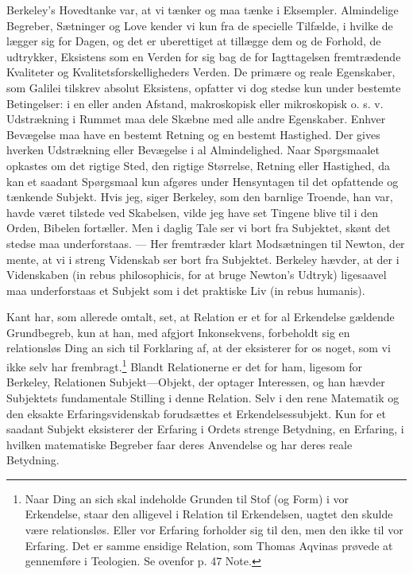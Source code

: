 \documentclass[12pt]{article}
\newcommand{\opage}[1]{\marginnote{\footnotesize\textit{[#1]}}}
\begin{document}
Berkeley's Hovedtanke var, at vi tænker og maa tænke
\opage{68} \setcounter{footnote}{0}
i Eksempler. Almindelige Begreber, Sætninger og Love kender vi kun fra de
specielle Tilfælde, i hvilke de lægger sig for Dagen, og det er uberettiget at
tillægge dem og de Forhold, de udtrykker, Eksistens som en Verden for sig bag
de for Iagttagelsen fremtrædende Kvaliteter og Kvalitetsforskelligheders
Verden. De \guillemotright primære og reale\guillemotleft{} Egenskaber, som
Galilei tilskrev absolut Eksistens, opfatter vi dog stedse kun under bestemte
Betingelser: i en eller anden Afstand, makroskopisk eller mikroskopisk
o. s. v. Udstrækning i Rummet maa dele Skæbne med alle andre Egenskaber.
Enhver Bevægelse maa have en bestemt Retning og en bestemt Hastighed. Der
gives hverken Udstrækning eller Bevægelse i al Almindelighed. Naar
Spørgsmaalet opkastes om det rigtige Sted, den rigtige Størrelse, Retning
eller Hastighed, da kan et saadant Spørgsmaal kun afgøres under Hensyntagen
til det opfattende og tænkende Subjekt. Hvis jeg, siger Berkeley, som den
barnlige Troende, han var, havde været tilstede ved Skabelsen, vilde jeg have
set Tingene blive til i den Orden, Bibelen fortæller. Men i daglig Tale ser vi
bort fra Subjektet, skønt det stedse maa underforstaas. --- Her fremtræder
klart Modsætningen til Newton, der mente, at vi i streng Videnskab ser bort
fra Subjektet. Berkeley hævder, at der i Videnskaben (in rebus philosophicis,
for at bruge Newton's Udtryk) ligesaavel maa underforstaas et Subjekt som i
det praktiske Liv (in rebus humanis).

Kant har, som allerede omtalt, set, at Relation er et for al Erkendelse
gældende Grundbegreb, kun at han, med afgjort Inkonsekvens, forbeholdt sig en
relationsløs \guillemotright Ding an sich\guillemotleft{} til Forklaring af,
at der eksisterer for os noget, som vi ikke selv har
frembragt.\footnote{Naar \guillemotright Ding an sich\guillemotleft{} skal
indeholde Grunden til Stof (og Form) i vor Erkendelse, staar den alligevel i
Relation til Erkendelsen, uagtet den skulde være relationsløs. Eller vor
Erfaring forholder sig til den, men den ikke til vor Erfaring. Det er samme
ensidige Relation, som Thomas Aqvinas prøvede at gennemføre i Teologien. Se
ovenfor p. 47 Note.} Blandt Relationerne er
\opage{69} \setcounter{footnote}{0}
det for ham, ligesom for Berkeley, Relationen Subjekt---Objekt, der optager
Interessen, og han hævder Subjektets fundamentale Stilling i denne Relation.
Selv i den rene Matematik og den eksakte Erfaringsvidenskab forudsættes et
Erkendelsessubjekt. Kun for et saadant Subjekt eksisterer der Erfaring i
Ordets strenge Betydning, en Erfaring, i hvilken matematiske Begreber faar
deres Anvendelse og har deres reale Betydning.
\end{document}
